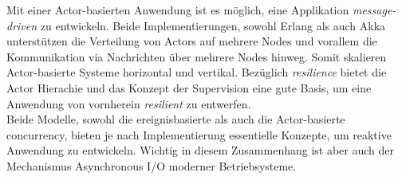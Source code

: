 Mit einer Actor-basierten Anwendung ist es möglich, eine Applikation \textit{message-driven} zu entwickeln. Beide Implementierungen, sowohl Erlang als auch Akka unterstützen die Verteilung von Actors auf mehrere Nodes und vorallem die Kommunikation via Nachrichten über mehrere Nodes hinweg. Somit skalieren Actor-basierte Systeme horizontal und vertikal. Bezüglich \textit{resilience} bietet die Actor Hierachie und das Konzept der Supervision eine gute Basis, um eine Anwendung von vornherein \textit{resilient} zu entwerfen.\\

Beide Modelle, sowohl die ereignisbasierte als auch die Actor-basierte \gls{concurrency}, bieten je nach Implementierung essentielle Konzepte, um reaktive Anwendung zu entwickeln. Wichtig in diesem Zusammenhang ist aber auch der Mechanismus Asynchronous I/O moderner Betriebsysteme.
